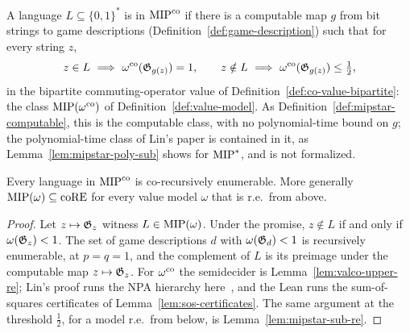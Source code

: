 \begin{definition}
\label{def:mipco}
\leanok
A language $L \subseteq \{0,1\}^*$ is in $\mathrm{MIP}^{\mathrm{co}}$ if there is a computable map $g$ from bit
strings to game descriptions (Definition~\ref{def:game-description}) such that for every
string $z$,
\begin{equation*}
  z \in L\ \Longrightarrow\ \omegaco(\game_{g(z)}) = 1,
  \qquad
  z \notin L\ \Longrightarrow\ \omegaco(\game_{g(z)}) \leq \tfrac12,
\end{equation*}
in the bipartite commuting-operator value of Definition~\ref{def:co-value-bipartite}: the
class $\mathrm{MIP}(\omega^{\mathrm{co}})$ of Definition~\ref{def:value-model}. As
Definition~\ref{def:mipstar-computable}, this is the computable class, with no
polynomial-time bound on $g$; the polynomial-time class of Lin's paper is contained in it, as
Lemma~\ref{lem:mipstar-poly-sub} shows for $\mathrm{MIP}^*$, and is not formalized.
\end{definition}

\begin{lemma}[$\MIPco \subseteq \coRE$]
\label{lem:mipco-sub-core}
\leanok
Every language in $\mathrm{MIP}^{\mathrm{co}}$ is co-recursively enumerable. More generally
$\mathrm{MIP}(\omega) \subseteq \mathrm{coRE}$ for every value model $\omega$ that is r.e.\ from above.
\end{lemma}

\begin{proof}
\leanok
Let $z \mapsto \mathfrak{G}_z$ witness $L \in \mathrm{MIP}(\omega)$. Under the promise, $z \notin L$ if
and only if $\omega(\mathfrak{G}_z) < 1$. The set of game descriptions $d$ with $\omega(\mathfrak{G}_d) < 1$
is recursively enumerable, at $p = q = 1$, and the complement of $L$ is its preimage under
the computable map $z \mapsto \mathfrak{G}_z$. For $\omega^{\mathrm{co}}$ the semidecider is
Lemma~\ref{lem:valco-upper-re}; Lin's proof runs the NPA hierarchy here~\cite{Lin25}, and the
Lean runs the sum-of-squares certificates of Lemma~\ref{lem:sos-certificates}. The same
argument at the threshold $\frac12$, for a model r.e.\ from below, is
Lemma~\ref{lem:mipstar-sub-re}.
\end{proof}

